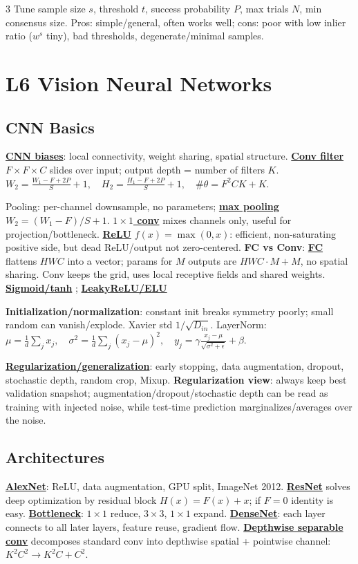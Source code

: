 \documentclass{article}
\numberwithin{equation}{subsection}
\newcommand{\key}[1]{\textbf{#1}}
\newcommand{\lowterm}[1]{\textbf{\underline{#1}}}
\begin{document}
\begin{multicols*}{3}
Tune sample size $s$, threshold $t$, success probability $P$, max trials $N$, min consensus size. Pros: simple/general, often works well; cons: poor with low inlier ratio ($w^s$ tiny), bad thresholds, degenerate/minimal samples.

\section{L6 Vision Neural Networks}
\subsection{CNN Basics}
\lowterm{CNN biases}: local connectivity, weight sharing, spatial structure. \lowterm{Conv filter} $F\times F\times C$ slides over input; output depth = number of filters $K$.
\(
W_2=\frac{W_1-F+2P}{S}+1,\quad
H_2=\frac{H_1-F+2P}{S}+1,\quad
\#\theta=F^2CK+K.
\)

Pooling: per-channel downsample, no parameters; \lowterm{max pooling} $W_2=(W_1-F)/S+1$. \lowterm{$1\times1$ conv} mixes channels only, useful for projection/bottleneck. \lowterm{ReLU} $f(x)=\max(0,x)$: efficient, non-saturating positive side, but dead ReLU/output not zero-centered.
\key{FC vs Conv}: \lowterm{FC} flattens $HWC$ into a vector; params for $M$ outputs are $HWC\cdot M+M$, no spatial sharing. Conv keeps the grid, uses local receptive fields and shared weights. \lowterm{Sigmoid/tanh} ; \lowterm{LeakyReLU/ELU}

\key{Initialization/normalization}: constant init breaks symmetry poorly; small random can vanish/explode. Xavier std $1/\sqrt{D_{in}}$.
LayerNorm:
\(
\mu=\frac1d\sum_jx_j,\quad \sigma^2=\frac1d\sum_j(x_j-\mu)^2,\quad y_j=\gamma\frac{x_j-\mu}{\sqrt{\sigma^2+\epsilon}}+\beta.
\)

\lowterm{Regularization/generalization}: early stopping, data augmentation, dropout, stochastic depth, random crop, Mixup. \key{Regularization view}: always keep best validation snapshot; augmentation/dropout/stochastic depth can be read as training with injected noise, while test-time prediction marginalizes/averages over the noise.

\subsection{Architectures}
\lowterm{AlexNet}: ReLU, data augmentation, GPU split, ImageNet 2012. \lowterm{ResNet} solves deep optimization by residual block $H(x)=F(x)+x$; if $F=0$ identity is easy. \lowterm{Bottleneck}: $1\times1$ reduce, $3\times3$, $1\times1$ expand. \lowterm{DenseNet}: each layer connects to all later layers, feature reuse, gradient flow. \lowterm{Depthwise separable conv} decomposes standard conv into depthwise spatial + pointwise channel:
\(
K^2C^2\to K^2C+C^2.
\)


\end{multicols*}
\end{document}
